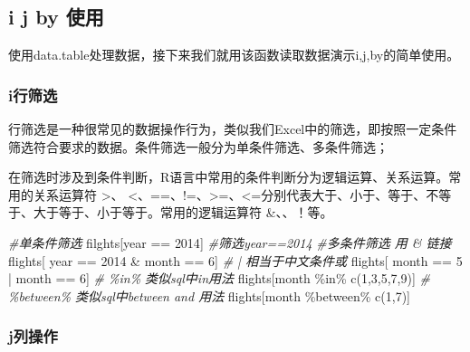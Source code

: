 \documentclass[
]{book}
\newenvironment{Shaded}{\begin{snugshade}}{\end{snugshade}}
\newcommand{\CommentTok}[1]{\textcolor[rgb]{0.56,0.35,0.01}{\textit{#1}}}
\newcommand{\DecValTok}[1]{\textcolor[rgb]{0.00,0.00,0.81}{#1}}
\newcommand{\FunctionTok}[1]{\textcolor[rgb]{0.00,0.00,0.00}{#1}}
\newcommand{\NormalTok}[1]{#1}
\newcommand{\SpecialCharTok}[1]{\textcolor[rgb]{0.00,0.00,0.00}{#1}}
\begin{document}
\hypertarget{i-j-by-ux4f7fux7528}{%
\subsection{i j by 使用}\label{i-j-by-ux4f7fux7528}}

使用data.table处理数据，接下来我们就用该函数读取数据演示i,j,by的简单使用。

\hypertarget{iux884cux7b5bux9009}{%
\subsubsection{i行筛选}\label{iux884cux7b5bux9009}}

行筛选是一种很常见的数据操作行为，类似我们Excel中的筛选，即按照一定条件筛选符合要求的数据。条件筛选一般分为单条件筛选、多条件筛选；

在筛选时涉及到条件判断，R语言中常用的条件判断分为逻辑运算、关系运算。常用的关系运算符 \textgreater、 \textless、==、!=、\textgreater=、\textless=分别代表大于、小于、等于、不等于、大于等于、小于等于。常用的逻辑运算符 \&、\textbar、！等。

\begin{Shaded}
\begin{Highlighting}[]
\CommentTok{\#单条件筛选}
\NormalTok{filghts[year }\SpecialCharTok{==} \DecValTok{2014}\NormalTok{] }\CommentTok{\#筛选year==2014}
\CommentTok{\#多条件筛选 用 \& 链接}
\NormalTok{flights[ year }\SpecialCharTok{==} \DecValTok{2014} \SpecialCharTok{\&}\NormalTok{ month }\SpecialCharTok{==} \DecValTok{6}\NormalTok{] }
\CommentTok{\# | 相当于中文条件或 }
\NormalTok{flights[ month }\SpecialCharTok{==} \DecValTok{5} \SpecialCharTok{|}\NormalTok{ month }\SpecialCharTok{==} \DecValTok{6}\NormalTok{] }
\CommentTok{\# \%in\% 类似sql中in用法}
\NormalTok{flights[month }\SpecialCharTok{\%in\%} \FunctionTok{c}\NormalTok{(}\DecValTok{1}\NormalTok{,}\DecValTok{3}\NormalTok{,}\DecValTok{5}\NormalTok{,}\DecValTok{7}\NormalTok{,}\DecValTok{9}\NormalTok{)] }
\CommentTok{\# \%between\% 类似sql中between and 用法}
\NormalTok{flights[month }\SpecialCharTok{\%between\%} \FunctionTok{c}\NormalTok{(}\DecValTok{1}\NormalTok{,}\DecValTok{7}\NormalTok{)]}
\end{Highlighting}
\end{Shaded}

\hypertarget{jux5217ux64cdux4f5c}{%
\subsubsection{j列操作}\label{jux5217ux64cdux4f5c}}
\end{document}
